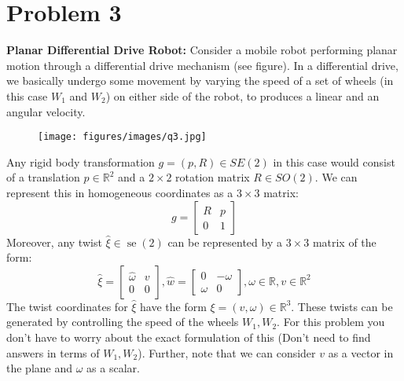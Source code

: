 \section*{Problem 3}

\textbf{Planar Differential Drive Robot:}
Consider a mobile robot performing planar motion through a differential drive mechanism (see figure).
In a differential drive, we basically undergo some movement by varying the speed of a set of wheels (in this case \( W_{1} \) and \( W_{2} \)) on either side of the robot, to produces a linear and an angular velocity.
\begin{figure}[h]
    \centering
    \texttt{[image: figures/images/q3.jpg]}
\end{figure}

Any rigid body transformation \( g=(p, R) \in S E(2) \) in this case would consist of a translation \( p \in \mathbb{R}^{2} \) and a \( 2 \times 2 \) rotation matrix \( R \in S O(2) \).
We can represent this in homogeneous coordinates as a \( 3 \times 3 \) matrix:
\[
    g=\left[\begin{array}{ll}
            R & p \\
            0 & 1
        \end{array}\right]
\]
Moreover, any twist \( \hat{\xi} \in \operatorname{se}(2) \) can be represented by a \( 3 \times 3 \) matrix of the form:
\[
    \hat{\xi}=\left[\begin{array}{ll}
            \hat{\omega} & v \\
            0            & 0
        \end{array}\right], \hat{w}=\left[\begin{array}{cc}
            0      & -\omega \\
            \omega & 0
        \end{array}\right], \omega \in \mathbb{R}, v \in \mathbb{R}^{2}
\]
The twist coordinates for \( \hat{\xi} \) have the form \( \xi=(v, \omega) \in \mathbb{R}^{3} \).
These twists can be generated by controlling the speed of the wheels \( W_{1}, W_{2} \).
For this problem you don't have to worry about the exact formulation of this
(Don't need to find answers in terms of \( W_{1}, W_{2} \)).
Further, note that we can consider \( v \) as a vector in the plane and \( \omega \) as a scalar.

